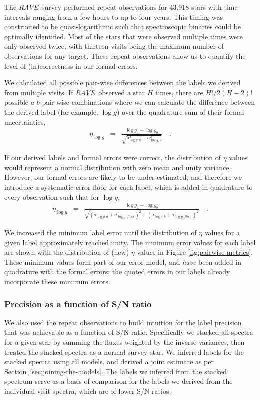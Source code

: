 \documentclass[preprint,trackchanges]{aastex}
\newcommand{\acronym}[1]{{\small{#1}}}
\newcommand{\project}[1]{\textsl{#1}}
\newcommand{\rave}{\project{\acronym{RAVE}}}
\newcommand{\logg}{\log g}
\begin{document}
The \rave\ survey performed repeat observations for 43,918 stars with time 
intervals ranging from a few hours to up to four years.  This timing was 
constructed to be quasi-logarithmic such that spectroscopic binaries could
be optimally identified. Most of the stars that were observed multiple times
were only observed twice, with thirteen visits being the maximum number 
of observations for any target.  These repeat observations allow us to 
quantify the level of (in)correctness in our formal errors.  


We calculated all possible pair-wise differences between the labels we
derived from multiple visits.  If \rave\ observed a star $H$ times, there 
are $H!/2(H-2)!$ possible $a$-$b$ pair-wise combinations where we can calculate 
the difference between the derived label (for example, $\logg$) over the
quadrature sum of their formal uncertainties,
\begin{eqnarray}
\eta_{\logg} & = & \frac{\logg_a - \logg_b}{\sqrt{\sigma_{\logg,a}^2 + \sigma_{\logg,b}^2}} \quad .
\end{eqnarray}

If our derived labels and formal errors were correct, the distribution of
$\eta$ values would represent a normal distribution with zero mean and
unity variance.  However, our formal errors are likely to be under-estimated,
and therefore we introduce a systematic error floor for each label, which
is added in quadrature to every observation such that for $\logg$,
\begin{eqnarray}
	\eta_{\logg} & = & \frac{\logg_a - \logg_b}{\sqrt{(\sigma_{\logg,a} + \sigma_{\logg,floor})^2 + (\sigma_{\logg,b} + \sigma_{\logg,floor})^2}} \quad .
\end{eqnarray}

We increased the minimum label error until the distribution of $\eta$ 
values for a given label approximately reached unity.  The minimum error
values for each label are shown with the distribution of (new) $\eta$
values in Figure \ref{fig:pairwise-metrics}.  These minimum values form
part of our error model, and \emph{have} been added in quadrature with 
the formal errors; the quoted errors in our labels already incorporate
these minimum errors.


\subsubsection{Precision as a function of S/N ratio}
\label{sec:precision-wrt-snr}


We also used the repeat observations to build intuition for the label
precision that was achievable as a function of S/N ratio.  Specifically
we stacked all spectra for a given star by summing the fluxes weighted
by the inverse variances, then treated the stacked spectra as a normal
survey star.  We inferred labels for the stacked spectra using all models,
and derived a joint estimate as per Section~\ref{sec:joining-the-models}.
The labels we inferred from the stacked spectrum serve as a basis of
comparison for the labels we derived from the individual visit spectra,
which are of lower S/N ratios.
\end{document}
